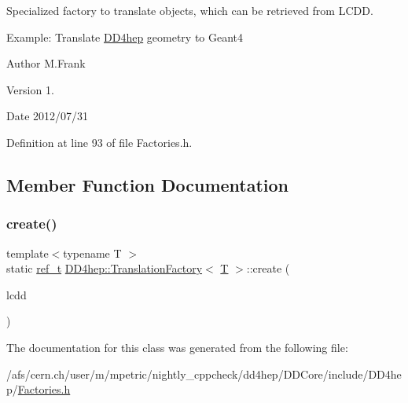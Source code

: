 Specialized factory to translate objects, which can be retrieved from L\+C\+DD. 

Example\+: Translate \hyperlink{namespace_d_d4hep}{D\+D4hep} geometry to Geant4

\begin{DoxyAuthor}{Author}
M.\+Frank 
\end{DoxyAuthor}
\begin{DoxyVersion}{Version}
1. 
\end{DoxyVersion}
\begin{DoxyDate}{Date}
2012/07/31 
\end{DoxyDate}


Definition at line 93 of file Factories.\+h.



\subsection{Member Function Documentation}
\hypertarget{class_d_d4hep_1_1_translation_factory_a9a32f69ddecbefc80fbeeb1c4a22624b}{}\label{class_d_d4hep_1_1_translation_factory_a9a32f69ddecbefc80fbeeb1c4a22624b} 
\subsubsection{\texorpdfstring{create()}{create()}}
{\footnotesize\ttfamily template$<$typename T $>$ \\
static \hyperlink{struct_d_d4hep_1_1_plugin_factory_base_ab13458952a5b4a91f5130d3ee4db4d33}{ref\+\_\+t} \hyperlink{class_d_d4hep_1_1_translation_factory}{D\+D4hep\+::\+Translation\+Factory}$<$ \hyperlink{class_t}{T} $>$\+::create (\begin{DoxyParamCaption}\item[{\hyperlink{class_d_d4hep_1_1_geometry_1_1_l_c_d_d}{Geometry\+::\+L\+C\+DD} \&}]{lcdd }\end{DoxyParamCaption})\hspace{0.3cm}{\ttfamily [static]}}



The documentation for this class was generated from the following file\+:\begin{DoxyCompactItemize}
\item 
/afs/cern.\+ch/user/m/mpetric/nightly\+\_\+cppcheck/dd4hep/\+D\+D\+Core/include/\+D\+D4hep/\hyperlink{_d_d_core_2include_2_d_d4hep_2_factories_8h}{Factories.\+h}\end{DoxyCompactItemize}
